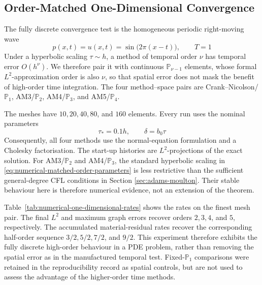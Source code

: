 \documentclass[11pt]{article}
\begin{document}

\subsection{Order-Matched One-Dimensional Convergence}
\label{subsec:numerical-one-dimensional-convergence}
The fully discrete convergence test is the homogeneous periodic right-moving
wave
\begin{equation}
p(x,t)=u(x,t)=\sin\bigl(2\pi(x-t)\bigr),\qquad T=1
\label{eq:numerical-one-dimensional-wave}
\end{equation}
Under a hyperbolic scaling \(\tau\sim h\), a method of temporal order \(\nu\)
has temporal error \(O(h^\nu)\). We therefore pair it with continuous
\(\mathbb P_{\nu-1}\) elements, whose formal \(L^2\)-approximation order is
also \(\nu\),
so that spatial error does not mask the benefit of high-order time
integration. The four
method--space pairs are Crank--Nicolson/\(\mathbb P_1\), AM3/\(\mathbb P_2\),
AM4/\(\mathbb P_3\), and AM5/\(\mathbb P_4\).

The meshes have \(10,20,40,80\), and \(160\) elements. Every run uses the
nominal parameters
\begin{equation}
\tau_*=0.1h,\qquad \delta=b_0\tau
\label{eq:numerical-matched-order-parameters}
\end{equation}
Consequently, all four methods use the normal-equation formulation and a
Cholesky factorisation. The start-up histories are \(L^2\)-projections of
the exact solution. For AM3/\(\mathbb P_2\) and AM4/\(\mathbb P_3\), the standard
hyperbolic scaling in \eqref{eq:numerical-matched-order-parameters} is less
restrictive than the sufficient general-degree CFL conditions in Section
\ref{sec:adams-moulton}. Their stable behaviour here is therefore numerical
evidence, not an extension of the theorem.

Table~\ref{tab:numerical-one-dimensional-rates} shows the rates on the finest
mesh pair. The final \(L^2\) and maximum graph errors recover orders
\(2,3,4\), and \(5\), respectively. The accumulated material-residual rates
recover the corresponding half-order sequence
\(3/2,5/2,7/2\), and \(9/2\). This experiment therefore exhibits the
fully discrete high-order behaviour in a PDE problem, rather than removing
the spatial error as in the manufactured temporal test. Fixed-\(\mathbb P_1\)
comparisons were retained in the reproducibility record as spatial controls,
but are not used to assess the advantage of the higher-order time methods.
\end{document}
